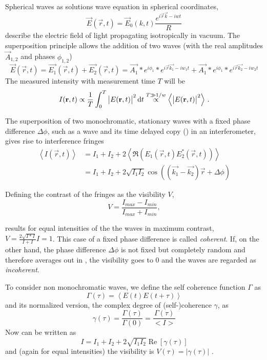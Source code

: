Spherical waves as solutions wave equation in spherical coordinates,
\begin{equation}
	\vec{E}(\vec{r},t)=\vec{E}_0(k,t) \frac{e^{i\vec{r}\vec{k}-iwt}}{R}
	\end{equation}
describe the electric field of light propagating isotropically in vacuum. 
The superposition principle allows the addition of two waves (with the real amplitudes $\vec{A}_{1,2}$ and phases $\phi_{1,2}$)
\begin{equation}
\vec{E}(\vec{r},t)=\vec{E_1}(\vec{r},t)+\vec{E_2}(\vec{r},t)=\vec{A_1}*e^{i\phi_1} * e^{i\vec{r}\vec{k_1}-iw_1t} + \vec{A_1}*e^{i\phi_1} * e^{i\vec{r}\vec{k_2}-iw_2t} 
\end{equation} 
The measured intensity with measurement time $T$ will be
\begin{equation}
	I(\mathbf{r},t)\propto \frac{1}{T} \int_0^T \left|E(\mathbf{r},t)\right|^2 \operatorname{\mathrm{d}\!} t
	\stackrel{T\gg1/w}{\propto}
    \left<\left|E(\mathbf{r},t)\right|^2\right> \,.
\end{equation}

The superposition of two monochromatic, stationary waves with a fixed phase difference $\Delta \phi$, such as a wave and its time delayed copy () in an interferometer, gives rise to interference fringes
\begin{align}
	\left<I(\vec{r},t)\right> & = I_1+I_2+2\left<\Re({E_1(\vec{r},t)}E_2^*(\vec{r},t))\right> \\
	& = I_1+I_2+2\sqrt{I_1I_2}\cos\left((\vec{k_1}-\vec{k_2})\vec{r}+\Delta \phi\right) 
\label{eq:interference}
\end{align}

Defining the contrast of the fringes as the visibility $V$,
\begin{equation}
	V=\frac{I_{max}-I_{min}}{I_{max}+I_{min}} ,
\end{equation} 

results for equal intensities of the the waves in maximum contrast,  $V=\frac{2\sqrt{I*I}}{I+I}I=1$. This case of a fixed phase difference is called \textit{coherent}.
If, on the other hand, the phase difference $\Delta \phi$ is not fixed but completely random and therefore averages out in , the visibility goes to 0 and the waves are regarded as \textit{incoherent}.

To consider non monochromatic waves, we define the self coherence function $\Gamma$ as 
\begin{equation}
\Gamma(\tau)=\left< E(t)E(t+\tau)\right>
\end{equation}
and its normalized version, the complex degree of (self-)coherence $\gamma$, as
\begin{equation}
\gamma(\tau)=\frac{\Gamma(\tau)}{\Gamma(0)} =  \frac{\Gamma(\tau)}{<I>}
\end{equation} 
Now  can be written as 
\begin{equation}
	I=I_{1}+I_{2}+2 \sqrt{I_{1} I_{2}} \operatorname{Re}\left[\gamma(\tau)\right]
\end{equation}
and (again for equal intensities) the visibility is $V(\tau)=\left|\gamma(\tau)\right|$ \cite{zernike1938,loudon2000}.

